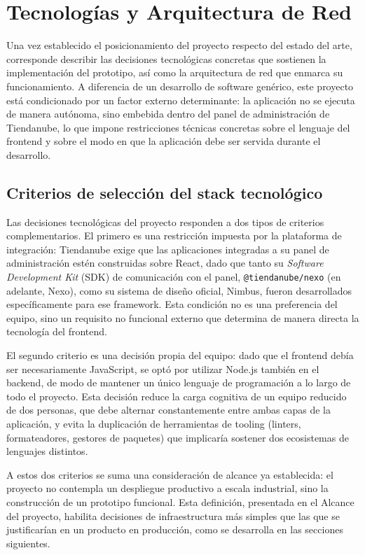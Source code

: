 \chapter{Tecnologías y Arquitectura de Red}

Una vez establecido el posicionamiento del proyecto respecto del estado del arte, corresponde describir las decisiones tecnológicas concretas que sostienen la implementación del prototipo, así como la arquitectura de red que enmarca su funcionamiento. A diferencia de un desarrollo de software genérico, este proyecto está condicionado por un factor externo determinante: la aplicación no se ejecuta de manera autónoma, sino embebida dentro del panel de administración de Tiendanube, lo que impone restricciones técnicas concretas sobre el lenguaje del frontend y sobre el modo en que la aplicación debe ser servida durante el desarrollo.

\section{Criterios de selección del stack tecnológico}
\label{sec:criterios-seleccion}

Las decisiones tecnológicas del proyecto responden a dos tipos de criterios complementarios. El primero es una restricción impuesta por la plataforma de integración: Tiendanube exige que las aplicaciones integradas a su panel de administración estén construidas sobre React, dado que tanto su \emph{Software Development Kit} (SDK) de comunicación con el panel, \texttt{@tiendanube/nexo} (en adelante, Nexo), como su sistema de diseño oficial, Nimbus, fueron desarrollados específicamente para ese framework. Esta condición no es una preferencia del equipo, sino un requisito no funcional externo que determina de manera directa la tecnología del frontend.

El segundo criterio es una decisión propia del equipo: dado que el frontend debía ser necesariamente JavaScript, se optó por utilizar Node.js también en el backend, de modo de mantener un único lenguaje de programación a lo largo de todo el proyecto. Esta decisión reduce la carga cognitiva de un equipo reducido de dos personas, que debe alternar constantemente entre ambas capas de la aplicación, y evita la duplicación de herramientas de tooling (linters, formateadores, gestores de paquetes) que implicaría sostener dos ecosistemas de lenguajes distintos.

A estos dos criterios se suma una consideración de alcance ya establecida: el proyecto no contempla un despliegue productivo a escala industrial, sino la construcción de un prototipo funcional. Esta definición, presentada en el Alcance del proyecto, habilita decisiones de infraestructura más simples que las que se justificarían en un producto en producción, como se desarrolla en las secciones siguientes.

